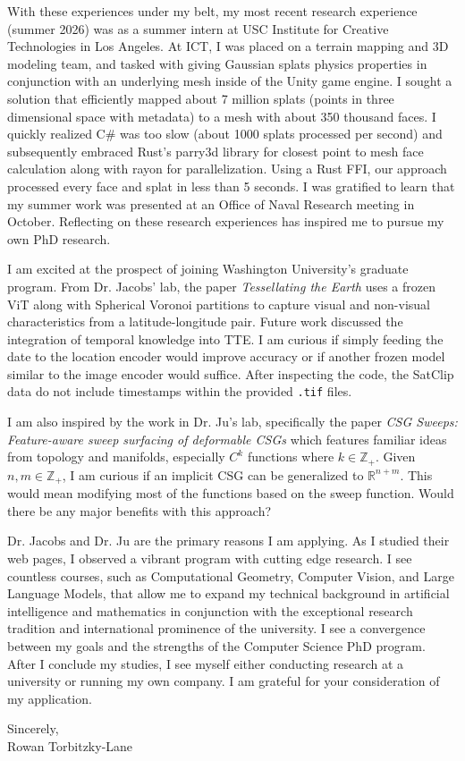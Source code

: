 \documentclass[12pt]{article}
\begin{document}
With these experiences under my belt, my most recent research experience (summer 2026) was as a summer intern at USC Institute for Creative Technologies in Los Angeles. At ICT, I was placed on a terrain mapping and 3D modeling team, and tasked with giving Gaussian splats \cite{kerbl3Dgaussians} physics properties in conjunction with an underlying mesh inside of the Unity game engine. I sought a solution that efficiently mapped about 7 million splats (points in three dimensional space with metadata) to a mesh with about 350 thousand faces. I quickly realized C\# was too slow (about 1000 splats processed per second) and subsequently embraced Rust's parry3d library for closest point to mesh face calculation along with rayon for parallelization. Using a Rust FFI, our approach processed every face and splat in less than 5 seconds. I was gratified to learn that my summer work was presented at an Office of Naval Research meeting in October. Reflecting on these research experiences has inspired me to pursue my own PhD research.

I am excited at the prospect of joining Washington University's graduate program. From Dr. Jacobs' lab, the paper \textit{Tessellating the Earth} \cite{cher2026tessellating} uses a frozen ViT \cite{dosovitskiy2021vit} along with Spherical Voronoi partitions \cite{disario2025sphericalvoronoi} to capture visual and non-visual characteristics from a latitude-longitude pair. Future work discussed the integration of temporal knowledge into TTE. I am curious if simply feeding the date to the location encoder would improve accuracy or if another frozen model similar to the image encoder would suffice. After inspecting the code, the SatClip \cite{klemmer2023satclip} data do not include timestamps within the provided \texttt{.tif} files.

I am also inspired by the work in Dr. Ju's lab, specifically the paper \textit{CSG Sweeps: Feature-aware sweep surfacing of deformable CSGs} \cite{xia2026csg} which features familiar ideas from topology and manifolds, especially $C^k$ functions where $k \in \mathbb{Z}_+$. Given $n,m \in \mathbb{Z}_+$, I am curious if an implicit CSG can be generalized to $\mathbb{R}^{n+m}$. This would mean modifying most of the functions based on the sweep function. Would there be any major benefits with this approach?

Dr. Jacobs and Dr. Ju are the primary reasons I am applying. As I studied their web pages, I observed a vibrant program with cutting edge research. I see countless courses, such as Computational Geometry, Computer Vision, and Large Language Models, that allow me to expand my technical background in artificial intelligence and mathematics in conjunction with the exceptional research tradition and international prominence of the university. I see a convergence between my goals and the strengths of the Computer Science PhD program. After I conclude my studies, I see myself either conducting research at a university or running my own company. I am grateful for your consideration of my application.

Sincerely, \\
Rowan Torbitzky-Lane

\pagebreak
\printbibliography
\end{document}
